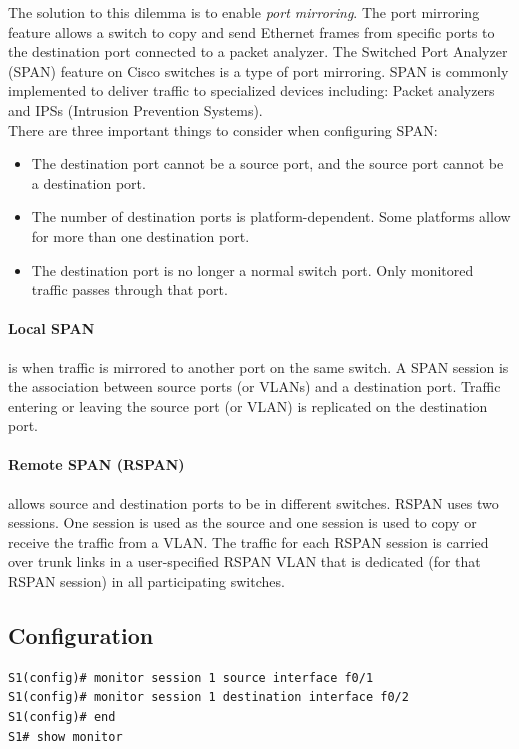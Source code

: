 The solution to this dilemma is to enable \emph{port mirroring}. The port mirroring feature allows a switch to copy and send Ethernet frames from specific ports to the destination port connected to a packet analyzer. The Switched Port Analyzer (SPAN) feature on Cisco switches is a type of port mirroring. SPAN is commonly implemented to deliver traffic to specialized devices including: Packet analyzers and IPSs (Intrusion Prevention Systems).\\

There are three important things to consider when configuring SPAN:
\begin{itemize}
\item The destination port cannot be a source port, and the source port cannot be a destination port.
\item The number of destination ports is platform-dependent. Some platforms allow for more than one destination port.
\item The destination port is no longer a normal switch port. Only monitored traffic passes through that port.
\end{itemize}

\paragraph{Local SPAN} is when traffic is mirrored to another port on the same switch. A SPAN session is the association between source ports (or VLANs) and a destination port. Traffic entering or leaving the source port (or VLAN) is replicated on the destination port. 

\paragraph{Remote SPAN (RSPAN)} allows source and destination ports to be in different switches. RSPAN uses two sessions. One session is used as the source and one session is used to copy or receive the traffic from a VLAN. The traffic for each RSPAN session is carried over trunk links in a user-specified RSPAN VLAN that is dedicated (for that RSPAN session) in all participating switches.

\subsection{Configuration}

\begin{verbatim}
S1(config)# monitor session 1 source interface f0/1
S1(config)# monitor session 1 destination interface f0/2
S1(config)# end
S1# show monitor
\end{verbatim}

